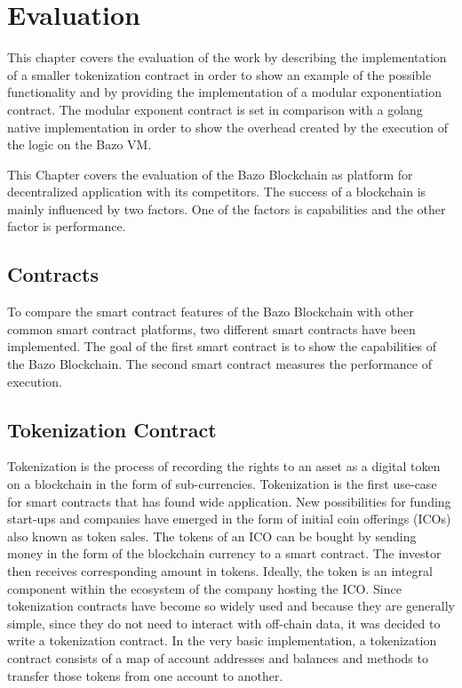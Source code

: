 \chapter{Evaluation}
This chapter covers the evaluation of the work by describing the implementation of a smaller tokenization contract in order to show an example of the possible functionality and by providing the implementation of a modular exponentiation contract. The modular exponent contract is set in comparison with a golang native implementation in order to show the overhead created by the execution of the logic on the Bazo VM. 




This Chapter covers the evaluation of the Bazo Blockchain as platform for decentralized application with its competitors. The success of a blockchain is mainly influenced by two factors. One of the factors is capabilities and the other factor is performance. 

\section{Contracts}
To compare the smart contract features of the Bazo Blockchain  with other common smart contract platforms, two different smart contracts have been implemented. The goal of the first smart contract is to show the capabilities of the Bazo Blockchain. The second smart contract measures the performance of execution.

\section{Tokenization Contract}
Tokenization is the process of recording the rights to an asset as a digital token on a blockchain in the form of sub-currencies. \cite{eth_whitepaper} Tokenization is the first use-case for smart contracts that has found wide application. New possibilities for funding start-ups and companies have emerged in the form of initial coin offerings (ICOs) also known as token sales. The tokens of an ICO can be bought by sending money in the form of the blockchain currency to a smart contract. The investor then receives corresponding amount in tokens. Ideally, the token is an integral component within the ecosystem of the company hosting the ICO. \cite{ico_pwc} Since tokenization contracts have become so widely used and because they are generally simple, since they do not need to interact with off-chain data, it was decided to write a tokenization contract. In the very basic implementation, a tokenization contract consists of a map of account addresses and balances and methods to transfer those tokens from one account to another.

